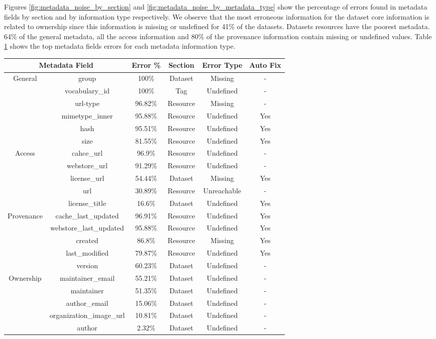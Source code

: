 \documentclass[runningheads,a4paper]{../../Util/LaTEX/llncs}
\begin{document}
Figures \ref{fig:metadata_noise_by_section} and \ref{fig:metadata_noise_by_metadata_type} show the percentage of errors found in metadata fields by section and by information type respectively. We observe that the most erroneous information for the dataset core information is related to ownership since this information is missing or undefined for 41\% of the datasets. Datasets resources have the poorest metadata. 64\% of the general metadata, all the access information and 80\% of the provenance information contain missing or undefined values. Table \ref{tab:top_metadata_fields_errors} shows the top metadata fields errors for each metadata information type.

\begin{table}
\begin{center}
\begin{tabular}{|c|c|c|c|c|c|}
\hline
\multicolumn{2}{|c|}{Metadata Field} & Error \% & Section & Error Type & Auto Fix\tabularnewline
\hline
\hline
\multirow{6}{*}{General } & group & 100\% & Dataset & Missing & -\tabularnewline
\cline{2-6}
 & vocabulary\_id & 100\% & Tag & Undefined & -\tabularnewline
\cline{2-6}
 & url-type & 96.82\% & Resource & Missing & -\tabularnewline
\cline{2-6}
 & mimetype\_inner & 95.88\% & Resource & Undefined & Yes\tabularnewline
\cline{2-6}
 & hash & 95.51\% & Resource & Undefined & Yes\tabularnewline
\cline{2-6}
 & size & 81.55\% & Resource & Undefined & Yes\tabularnewline
\hline
\multirow{5}{*}{Access } & cahce\_url & 96.9\% & Resource & Undefined & -\tabularnewline
\cline{2-6}
 & webstore\_url & 91.29\% & Resource & Undefined & -\tabularnewline
\cline{2-6}
 & license\_url & 54.44\% & Dataset & Missing & Yes\tabularnewline
\cline{2-6}
 & url & 30.89\% & Resource & Unreachable & -\tabularnewline
\cline{2-6}
 & license\_title & 16.6\% & Dataset & Undefined & Yes\tabularnewline
\hline
\multirow{5}{*}{Provenance } & cache\_last\_updated & 96.91\% & Resource & Undefined & Yes\tabularnewline
\cline{2-6}
 & webstore\_last\_updated & 95.88\% & Resource & Undefined & Yes\tabularnewline
\cline{2-6}
 & created & 86.8\% & Resource & Missing & Yes\tabularnewline
\cline{2-6}
 & last\_modified & 79.87\% & Resource & Undefined & Yes\tabularnewline
\cline{2-6}
 & version & 60.23\% & Dataset & Undefined & -\tabularnewline
\hline
\multirow{5}{*}{Ownership } & maintainer\_email & 55.21\% & Dataset & Undefined & -\tabularnewline
\cline{2-6}
 & maintainer & 51.35\% & Dataset & Undefined & -\tabularnewline
\cline{2-6}
 & author\_email & 15.06\% & Dataset & Undefined & -\tabularnewline
\cline{2-6}
 & organization\_image\_url & 10.81\% & Dataset & Undefined & -\tabularnewline
\cline{2-6}
 & author & 2.32\% & Dataset & Undefined & -\tabularnewline
\hline
\end{tabular}
\label{tab:top_metadata_fields_errors}
\end{center}
\end{table}
\end{document}
